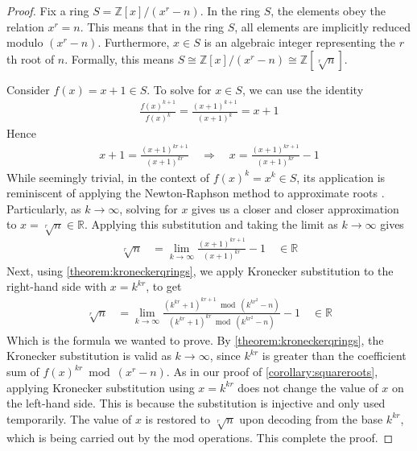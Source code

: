 \documentclass[11pt,reqno]{article}
\theoremstyle{plain}
\theoremstyle{definition}
\begin{document}
\begin{proof}
Fix a ring $S = \mathbb{Z}[x]/(x^r - n)$. In the ring $S$, the elements obey the relation $x^r = n$. This means that in the ring $S$, all elements are implicitly reduced modulo $(x^r - n)$. Furthermore, $x \in S$ is an algebraic integer representing the $r$th root of $n$. Formally, this means $S \cong \mathbb{Z}[x]/(x^r - n) \cong \mathbb{Z}[\sqrt[r]{n}]$.

Consider $f(x) = x+1 \in S$. To solve for $x \in S$, we can use the identity
\begin{align*}
    \frac{f(x)^{k+1}}{f(x)^k} = \frac{(x+1)^{k+1}}{(x+1)^k} = x + 1
\end{align*}
Hence
\begin{align*}
    x + 1 = \frac{(x+1)^{kr+1}}{(x+1)^{kr}}
    \quad \Longrightarrow \quad
    x = \frac{(x+1)^{kr+1}}{(x+1)^{kr}} - 1
\end{align*}
While seemingly trivial, in the context of $f(x)^k = x^k \in S$, its application is reminiscent of applying the Newton-Raphson method to approximate roots \cite{hubbard2001roots}. Particularly, as $k\rightarrow\infty$, solving for $x$ gives us a closer and closer approximation to $x = \sqrt[r]{n} \in \mathbb{R}$. Applying this substitution and taking the limit as $k\rightarrow\infty$ gives
\begin{align*}
    \sqrt[r]{n} &= \lim_{k\rightarrow\infty} \frac{(x+1)^{kr+1}}{(x+1)^{kr}} - 1 \quad \in \mathbb{R}
\end{align*}
Next, using \cref{theorem:kroneckerqrings}, we apply Kronecker substitution to the right-hand side with $x = k^{kr}$, to get
\begin{align*}
\sqrt[r]{n} &= \lim_{k\rightarrow\infty}
    \frac{(k^{kr} + 1)^{kr+1} \bmod{(k^{kr^2}-n)}}
    {(k^{kr} + 1)^{kr} \bmod{ (k^{kr^2}-n)}} - 1  \quad \in \mathbb{R}
\end{align*}
Which is the formula we wanted to prove. By \cref{theorem:kroneckerqrings}, the Kronecker substitution is valid as $k\rightarrow\infty$, since $k^{kr}$ is greater than the coefficient sum of $f(x)^{kr} \bmod{(x^r-n)}$. As in our proof of \cref{corollary:squareroots}, applying Kronecker substitution using $x=k^{kr}$ does not change the value of $x$ on the left-hand side. This is because the substitution is injective and only used temporarily. The value of $x$ is restored to $\sqrt[r]{n}$ upon decoding from the base $k^{kr}$, which is being carried out by the mod operations. This complete the proof.
\end{proof}
\end{document}
